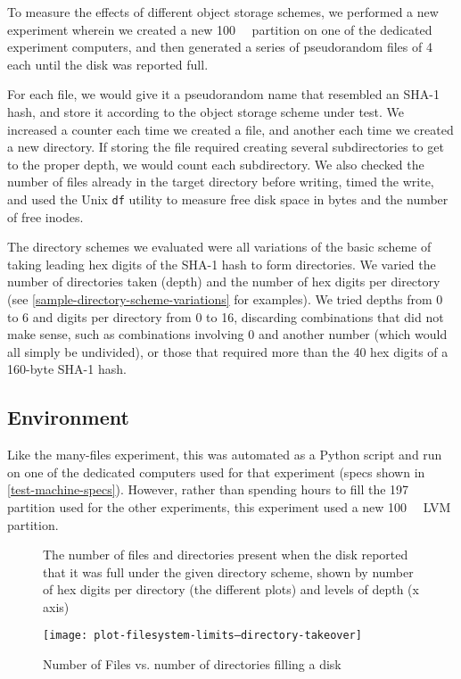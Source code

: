 To measure the effects of different object storage schemes, we performed a new
experiment wherein we created a new \SI{100}{\mebi\byte} partition on one of the
dedicated experiment computers, and then generated a series of pseudorandom
files of \SI{4}{\kibi\byte} each until the disk was reported full.

For each file, we would give it a pseudorandom name that resembled an SHA-1
hash, and store it according to the object storage scheme under test. We
increased a counter each time we created a file, and another each time we
created a new directory. If storing the file required creating several
subdirectories to get to the proper depth, we would count each subdirectory. We
also checked the number of files already in the target directory before writing,
timed the write, and used the Unix \lstinline{df} utility to measure free disk
space in bytes and the number of free \glspl{inode}.

The directory schemes we evaluated were all variations of the basic scheme of
taking leading hex digits of the SHA-1 hash to form directories. We varied the
number of directories taken (depth) and the number of hex digits per directory
(see \autoref{sample-directory-scheme-variations} for examples). We tried depths
from \num{0} to \num{6} and digits per directory from \num{0} to \num{16},
discarding combinations that did not make sense, such as combinations involving
\num{0} and another number (which would all simply be undivided), or those that
required more than the \num{40} hex digits of a \num{160}-byte SHA-1 hash.

\subsection{Environment}

Like the many-files experiment, this was automated as a Python script and run
on one of the dedicated computers used for that experiment (specs shown in
\autoref{test-machine-specs}). However, rather than spending hours to fill the
\SI{197}{\gibi\byte} partition used for the other experiments, this experiment
used a new \SI{100}{\mebi\byte} LVM partition.


\begin{figure}[b!]
        \caption{Number of Files vs. number of directories filling a disk}
        \label{fig:plot-filesystem-limits--directory-takeover}
        \centering

        The number of files and directories present when the disk reported that it
        was full under the given directory scheme, shown by number of hex digits per
        directory (the different plots) and levels of depth (x axis)

        \texttt{[image: plot-filesystem-limits--directory-takeover]}
\end{figure}

